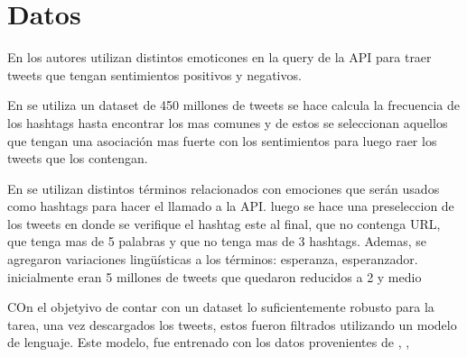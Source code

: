 \chapter{Datos}

En \cite{pak2010twitter} los autores utilizan distintos emoticones en la query de la API para traer tweets que tengan sentimientos positivos y negativos. 

En \cite{davidov2010enhanced} se utiliza un dataset de 450 millones de tweets se hace calcula la frecuencia de los hashtags hasta encontrar los mas comunes y de estos se seleccionan aquellos que tengan una asociación mas fuerte con los sentimientos para luego raer los tweets que los contengan.


En \cite{wang2012harnessing} se utilizan distintos términos relacionados con emociones que serán usados como hashtags para hacer el llamado a la API. luego se hace una preseleccion de los tweets en donde se verifique el hashtag este al final, que no contenga URL, que tenga mas de 5 palabras y que no tenga mas de 3 hashtags. Ademas, se agregaron variaciones lingüísticas a los términos: esperanza, esperanzador. inicialmente eran 5 millones de tweets que quedaron reducidos a 2 y medio


COn el objetyivo de contar con un dataset lo suficientemente robusto para la tarea, una vez descargados los tweets, estos fueron filtrados utilizando un modelo de lenguaje. Este modelo, fue entrenado con los datos provenientes de \cite{mohammad2018semeval}, \cite{sidorov2016construccion}, \cite{plaza2020emoevent}